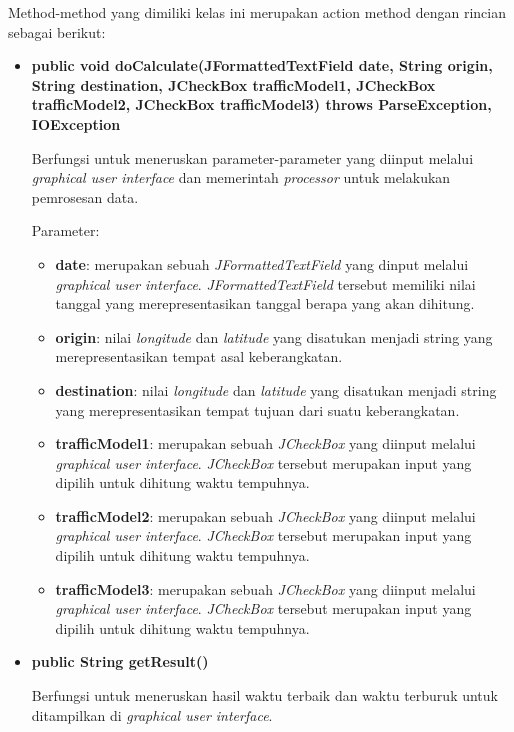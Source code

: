 \begin{enumerate}
	Method-method yang dimiliki kelas ini merupakan action method dengan rincian sebagai berikut:
	
	\begin{itemize}
		\item \textbf{public void doCalculate(JFormattedTextField date, String origin, String destination, JCheckBox trafficModel1, JCheckBox trafficModel2, JCheckBox trafficModel3) throws ParseException, IOException} 
		
		Berfungsi untuk meneruskan parameter-parameter yang diinput melalui \textit{graphical user interface} dan memerintah \textit{processor} untuk melakukan pemrosesan data.
		
		Parameter:
	\begin{itemize}
		\item \textbf{date}: merupakan sebuah \textit{JFormattedTextField} yang dinput melalui \textit{graphical user interface}. \textit{JFormattedTextField} tersebut memiliki nilai tanggal yang merepresentasikan tanggal berapa yang akan dihitung. 
		\item \textbf{origin}: nilai \textit{longitude} dan \textit{latitude} yang disatukan menjadi string yang merepresentasikan tempat asal keberangkatan.
		\item \textbf{destination}: nilai \textit{longitude} dan \textit{latitude} yang disatukan menjadi string yang merepresentasikan tempat tujuan dari suatu keberangkatan.
		\item \textbf{trafficModel1}: merupakan sebuah \textit{JCheckBox} yang diinput melalui \textit{graphical user interface}. \textit{JCheckBox} tersebut merupakan input yang dipilih untuk dihitung waktu tempuhnya.
		\item \textbf{trafficModel2}: merupakan sebuah \textit{JCheckBox} yang diinput melalui \textit{graphical user interface}. \textit{JCheckBox} tersebut merupakan input yang dipilih untuk dihitung waktu tempuhnya.
		\item \textbf{trafficModel3}: merupakan sebuah \textit{JCheckBox} yang diinput melalui \textit{graphical user interface}. \textit{JCheckBox} tersebut merupakan input yang dipilih untuk dihitung waktu tempuhnya.
	\end{itemize}
		
		\item \textbf{public String getResult()}
		
		Berfungsi untuk meneruskan hasil waktu terbaik dan waktu terburuk untuk ditampilkan di \textit{graphical user interface}.
		

\end{itemize}
\end{enumerate}
